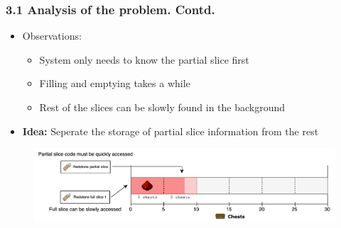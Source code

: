 \documentclass[aspectratio=169]{beamer}
\begin{document}


\begin{frame}
	\frametitle{3.1 Analysis of the problem. Contd.}

    \begin{itemize}
		\item Observations:
        \begin{itemize}
            \item System only needs to know the partial slice first
            \item Filling and emptying takes a while
            \item Rest of the slices can be slowly found in the background
        \end{itemize}
        \item \textbf{Idea:} Seperate the storage of partial slice information from the rest
	\end{itemize}

    \begin{figure}
        \includegraphics[width=1\textwidth]{fastslow.png}
    \end{figure}
\end{frame}
\end{document}
